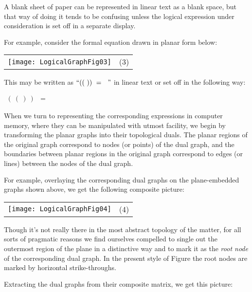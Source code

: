 \documentclass[12pt]{article}
\begin{document}
A blank sheet of paper can be represented in linear text as a blank space, but that way of doing it tends to be confusing unless the logical expression under consideration is set off in a separate display.

For example, consider the formal equation drawn in planar form below:

\begin{center}\begin{tabular}{cc}
\texttt{[image: LogicalGraphFig03]} & (3) \\
\end{tabular}\end{center}

This may be written as $``((~))~=~~"$ in linear text or set off in the following way:

\begin{center}$\begin{matrix}
(~(~)~) & = & ~~~~~~~
\end{matrix}$\end{center}

When we turn to representing the corresponding expressions in computer memory, where they can be manipulated with utmost facility, we begin by transforming the planar graphs into their topological duals.  The planar regions of the original graph correspond to nodes (or points) of the dual graph, and the boundaries between planar regions in the original graph correspond to edges (or lines) between the nodes of the dual graph.

For example, overlaying the corresponding dual graphs on the plane-embedded graphs shown above, we get the following composite picture:

\begin{center}\begin{tabular}{cc}
\texttt{[image: LogicalGraphFig04]} & (4) \\
\end{tabular}\end{center}

Though it's not really there in the most abstract topology of the matter, for all sorts of pragmatic reasons we find ourselves compelled to single out the outermost region of the plane in a distinctive way and to mark it as the \textit{root node} of the corresponding dual graph. In the present style of Figure the root nodes are marked by horizontal strike-throughs.

Extracting the dual graphs from their composite matrix, we get this picture:
\end{document}
